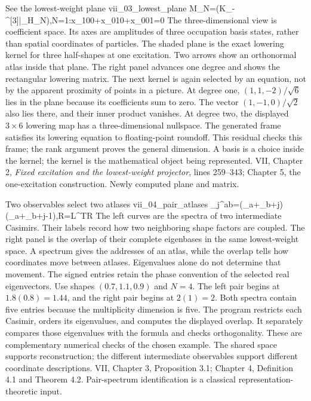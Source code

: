 {See the lowest-weight plane}
{vii_03_lowest_plane}
{M_N=\ker(K_-^{[3]}|_{H_N}),\qquad N=1:\quad x_{100}+x_{010}+x_{001}=0}
{The three-dimensional view is coefficient space. Its axes are amplitudes of three occupation basis states, rather than spatial coordinates of particles. The shaded plane is the exact lowering kernel for three half-shapes at one excitation. Two arrows show an orthonormal atlas inside that plane. The right panel advances one degree and shows the rectangular lowering matrix. The next kernel is again selected by an equation, not by the apparent proximity of points in a picture.}
{At degree one, $(1,1,-2)/\sqrt6$ lies in the plane because its coefficients sum to zero. The vector $(1,-1,0)/\sqrt2$ also lies there, and their inner product vanishes. At degree two, the displayed $3\times6$ lowering map has a three-dimensional nullspace. The generated frame satisfies its lowering equation to floating-point roundoff. This residual checks this frame; the rank argument proves the general dimension.}
{A basis is a choice inside the kernel; the kernel is the mathematical object being represented.}
{VII, Chapter 2, \emph{Fixed excitation and the lowest-weight projector}, lines 259--343; Chapter 5, the one-excitation construction. Newly computed plane and matrix.}

{Two observables select two atlases}
{vii_04_pair_atlases}
{\lambda_j^{ab}=(\kappa_a+\kappa_b+j)(\kappa_a+\kappa_b+j-1),\qquad \mathcal R=L^{\mathsf T}R}
{The left curves are the spectra of two intermediate Casimirs. Their labels record how two neighboring shape factors are coupled. The right panel is the overlap of their complete eigenbases in the same lowest-weight space. A spectrum gives the addresses of an atlas, while the overlap tells how coordinates move between atlases. Eigenvalues alone do not determine that movement. The signed entries retain the phase convention of the selected real eigenvectors.}
{Use shapes $(0.7,1.1,0.9)$ and $N=4$. The left pair begins at $1.8(0.8)=1.44$, and the right pair begins at $2(1)=2$. Both spectra contain five entries because the multiplicity dimension is five. The program restricts each Casimir, orders its eigenvalues, and computes the displayed overlap. It separately compares those eigenvalues with the formula and checks orthogonality. These are complementary numerical checks of the chosen example.}
{The shared space supports reconstruction; the different intermediate observables support different coordinate descriptions.}
{VII, Chapter 3, Proposition 3.1; Chapter 4, Definition 4.1 and Theorem 4.2. Pair-spectrum identification is a classical representation-theoretic input.}

